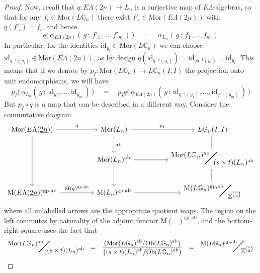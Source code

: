 \documentclass{amsbook} %
\newcommand{\bigquotient}[2]{ \raisebox{0.75\height}{$#1$} \mkern-12mu\scalebox{2}{$\diagup$}\mkern-10mu \raisebox{-0.5\height}{$#2$} }
\newcommand{\ELnn}{E\Lambda(\underline{2n})}
\numberwithin{section}{chapter}
\begin{document}
\begin{proof}
Now, recall that $q: \ELnn \to L_n$ is a surjective map of $E\Lambda$-algebras, so that for any $f_i \in \mathrm{Mor}(L\mathbb{G}_{n})$ there exist $f'_i \in \mathrm{Mor}(\ELnn)$ with $q(f'_i) = f_i$, and hence
\[ q\big( \, \alpha_{\ELnn}( \, g \, ; \, f'_1, ..., f'_m \, ) \, \big) \quad = \quad \alpha_{L_n}( \, g \, ; \, f_1, ..., f_m \, ) \]
In particular, for the identities $\mathrm{id}_{y_i} \in \mathrm{Mor}(L\mathbb{G}_{n})$ we can choose $\mathrm{id}_{q^{-1}(y_i)} \in \mathrm{Mor}(\ELnn)$, as by design $q(\mathrm{id}_{q^{-1}(y_i)}) = \mathrm{id}_{qq^{-1}(y_i)} = \mathrm{id}_{y_i}$. This means that if we denote by $p_I :  \mathrm{Mor}(L\mathbb{G}_{n}) \to L\mathbb{G}_{n}(I,I)$ the projection onto unit endomorphisms, we will have
\[ p_I \big( \, \alpha_{L_n}( \, g \, ; \, \mathrm{id}_{y_1}, ..., \mathrm{id}_{y_m} \, ) \, \big) \quad = \quad  p_I q\big( \, \alpha_{\ELnn}( \, g \, ; \, \mathrm{id}_{q^{-1}(y_1)}, ..., \mathrm{id}_{q^{-1}(y_m)} \, ) \, \big) \]
But $p_I \circ q$ is a map that can be described in a different way. Consider the commutative diagram
\[ \begin{tikzcd}
\mathrm{Mor}(\ELnn) \ar[rr, "q"] \ar[dd] & & \mathrm{Mor}(L_n) \ar[d, "\mathrm{ab}"] \ar[rr, "p_I"] & &  L\mathbb{G}_{n}(I,I) \ar[d, equals] \\
& & \mathrm{Mor}(L_n)^{\mathrm{ab}} \ar[d] \ar[rr] & & \bigquotient{\mathrm{Mor}(L\mathbb{G}_{n})^{\mathrm{ab}}}{(s \times t)(L_n)^{\mathrm{ab}}} \ar[d, equals] \\
\mathrm{M}(\ELnn)^{\mathrm{gp},\mathrm{ab}} \ar[rr, "\mathrm{M}(q)^{\mathrm{gp},\mathrm{ab}}"] & & \mathrm{M}(L_n)^{\mathrm{gp},\mathrm{ab}} \ar[rr] & & \bigquotient{\mathrm{M}(L\mathbb{G}_{n})^{\mathrm{gp}, \mathrm{ab}}}{\mathbb{Z}^{{n}\choose{2}}}
\end{tikzcd} \]
where all unlabelled arrows are the appropriate quotient maps. The region on the left commutes by naturality of the adjoint functor $\mathrm{M}(\, \_ \,)^{\mathrm{gp},\mathrm{ab}}$, and the bottom-right square uses the fact that
\[ \begin{array}{rllll}
			\bigquotient{\mathrm{Mor}(L\mathbb{G}_{n})^{\mathrm{ab}}}{(s \times t)(L_n)^{\mathrm{ab}}} & = & \frac{ \displaystyle  \left(\mathrm{Mor}(L\mathbb{G}_{n})^{\mathrm{ab}}/\mathrm{Ob}(L\mathbb{G}_{n})^{\mathrm{ab}} \right)}{ \displaystyle \left( (s \times t)(L_n)^{\mathrm{ab}}/\mathrm{Ob}(L\mathbb{G}_{n})^{\mathrm{ab}} \right)} & = & \bigquotient{\mathrm{M}(L\mathbb{G}_{n})^{\mathrm{gp}, \mathrm{ab}}}{\mathbb{Z}^{{n}\choose{2}}}
		\end{array}
\]
\end{proof}
\end{document}
